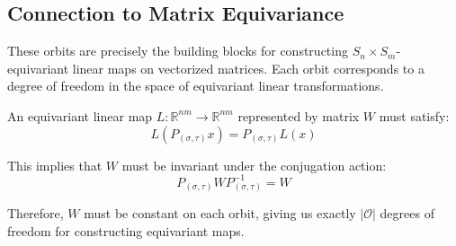 \documentclass[11pt]{article}
\begin{document}
\subsection{Connection to Matrix Equivariance}

These orbits are precisely the building blocks for constructing $S_n \times S_m$-equivariant linear maps on vectorized matrices. Each orbit corresponds to a degree of freedom in the space of equivariant linear transformations.

An equivariant linear map $L: \mathbb{R}^{nm} \to \mathbb{R}^{nm}$ represented by matrix $W$ must satisfy:
\[
L(P_{(\sigma,\tau)} x) = P_{(\sigma,\tau)} L(x)
\]

This implies that $W$ must be invariant under the conjugation action:
\[
P_{(\sigma,\tau)} W P_{(\sigma,\tau)}^{-1} = W
\]

Therefore, $W$ must be constant on each orbit, giving us exactly $|\mathcal{O}|$ degrees of freedom for constructing equivariant maps.
\end{document}
